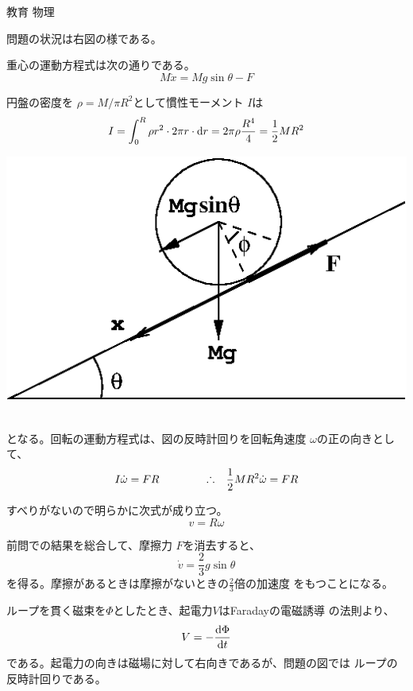 \documentclass[fleqn]{jbook}
\begin{document}
\begin{answer}{教育 物理}{}

\begin{subanswers}
\SubAnswer
  問題の状況は右図の様である。

  \begin{subsubanswers}
  \vspace*{-5mm}\parbox[t]{85mm}{
  \SubSubAnswer
    重心の運動方程式は次の通りである。
%
    \[ M\ddot{x} = Mg\sin\theta - F \]
%


  \SubSubAnswer
    円盤の密度を $\rho = M/\pi R^{2}$として慣性モーメント $I$は
%
    \[ I = \int_{0}^{R} \rho r^{2} \cdot 2\pi r \cdot \d{r}%
         = 2\pi\rho \frac{R^{4}}{4} = \frac{1}{2}MR^{2} \]
%
    }\parbox[t]{70mm}{\vspace*{-15mm}
    \begin{center}
      \mbox{\includegraphics[clip]{1993phys-2.eps}}
    \end{center}}\\
%
    となる。回転の運動方程式は、図の反時計回りを回転角速度
    $\omega$の正の向きとして、
%
    \[ I\dot{\omega} = FR \hspace{15mm}%
       \Yueni \frac{1}{2}MR^{2} \dot{\omega} = FR \]
%

  \SubSubAnswer
    すべりがないので明らかに次式が成り立つ。
%
    \[ v = R\omega \]
%

  \SubSubAnswer
    前問での結果を総合して、摩擦力 $F$を消去すると、
%
    \[ \dot{v} = \frac{2}{3}g\sin\theta \]
%
    を得る。摩擦があるときは摩擦がないときの$\frac{2}{3}$倍の加速度
    をもつことになる。

  \end{subsubanswers}



\SubAnswer
  \begin{subsubanswers}
  \SubSubAnswer
    ループを貫く磁束を$\Phi$としたとき、起電力$V$はFaradayの電磁誘導
    の法則より、
%
    \[ V = - {\frac{{\rm d} \Phi}{{\rm d} t}} \]
%
    である。起電力の向きは磁場に対して右向きであるが、問題の図では
    ループの反時計回りである。


\end{subsubanswers}
\end{subanswers}
\end{answer}
\end{document}

